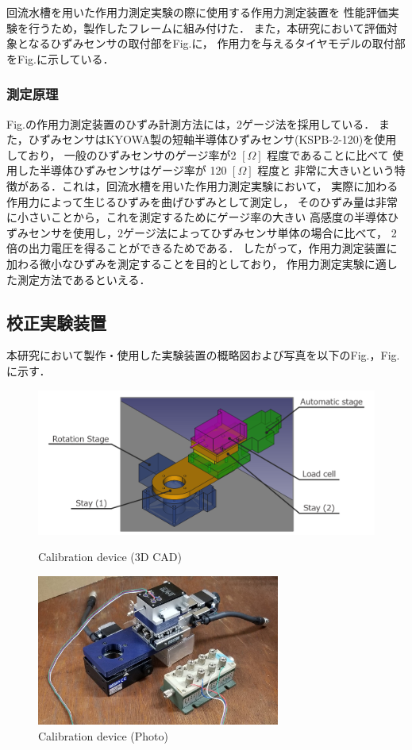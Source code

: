 回流水槽を用いた作用力測定実験の際に使用する作用力測定装置を
性能評価実験を行うため，製作したフレームに組み付けた．
また，本研究において評価対象となるひずみセンサの取付部をFig.に，
作用力を与えるタイヤモデルの取付部をFig.に示している．

\newpage

\subsubsection{測定原理}

Fig.の作用力測定装置のひずみ計測方法には，2ゲージ法を採用している．
また，ひずみセンサはKYOWA製の短軸半導体ひずみセンサ(KSPB-2-120)を使用しており，
一般のひずみセンサのゲージ率が2 $[\Omega]$ 程度であることに比べて
使用した半導体ひずみセンサはゲージ率が 120 $[\Omega]$ 程度と
非常に大きいという特徴がある．これは，回流水槽を用いた作用力測定実験において，
実際に加わる作用力によって生じるひずみを曲げひずみとして測定し，
そのひずみ量は非常に小さいことから，これを測定するためにゲージ率の大きい
高感度の半導体ひずみセンサを使用し，2ゲージ法によってひずみセンサ単体の場合に比べて，
2倍の出力電圧を得ることができるためである．
したがって，作用力測定装置に加わる微小なひずみを測定することを目的としており，
作用力測定実験に適した測定方法であるといえる．

\subsection{校正実験装置}
本研究において製作・使用した実験装置の概略図および写真を以下のFig.，Fig.に示す．

\begin{figure}[htbp]
    \footnotesize
    \begin{center}
        \includegraphics[width=120mm]{images/22-1.png}
        \caption{Calibration device (3D CAD)}
        \includegraphics[width=80mm]{images/22-2.png}
        \caption{Calibration device (Photo)}
    \end{center}
\end{figure}

